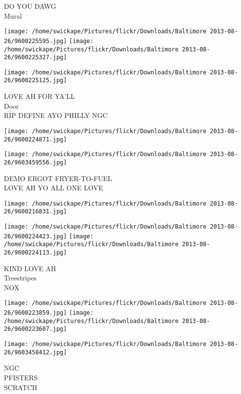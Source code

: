 \documentclass[10pt,letterpaper]{article}
\begin{document}
DO YOU DAWG\\
Mural\\
\pagebreak

\texttt{[image: /home/swickape/Pictures/flickr/Downloads/Baltimore 2013-08-26/9600225595.jpg]}
\texttt{[image: /home/swickape/Pictures/flickr/Downloads/Baltimore 2013-08-26/9600225327.jpg]}

\vspace{0.25in}
\texttt{[image: /home/swickape/Pictures/flickr/Downloads/Baltimore 2013-08-26/9600225125.jpg]}

LOVE AH FOR YA'LL\\
Door\\
RIP DEFINE AYO PHILLY NGC\\
\pagebreak

\texttt{[image: /home/swickape/Pictures/flickr/Downloads/Baltimore 2013-08-26/9600224871.jpg]}

\vspace{0.25in}
\texttt{[image: /home/swickape/Pictures/flickr/Downloads/Baltimore 2013-08-26/9603459556.jpg]}

DEMO ERGOT FRYER{-}TO{-}FUEL\\
LOVE AH YO ALL ONE LOVE\\
\pagebreak

\texttt{[image: /home/swickape/Pictures/flickr/Downloads/Baltimore 2013-08-26/9600216831.jpg]}

\vspace{0.25in}
\texttt{[image: /home/swickape/Pictures/flickr/Downloads/Baltimore 2013-08-26/9600224423.jpg]}
\texttt{[image: /home/swickape/Pictures/flickr/Downloads/Baltimore 2013-08-26/9600224113.jpg]}

KIND LOVE AH\\
Treestripes\\
NOX\\
\pagebreak

\texttt{[image: /home/swickape/Pictures/flickr/Downloads/Baltimore 2013-08-26/9600223859.jpg]}
\texttt{[image: /home/swickape/Pictures/flickr/Downloads/Baltimore 2013-08-26/9600223607.jpg]}

\vspace{0.25in}
\texttt{[image: /home/swickape/Pictures/flickr/Downloads/Baltimore 2013-08-26/9603458412.jpg]}

NGC\\
PFISTERS\\
SCRATCH\\
\pagebreak
\end{document}
